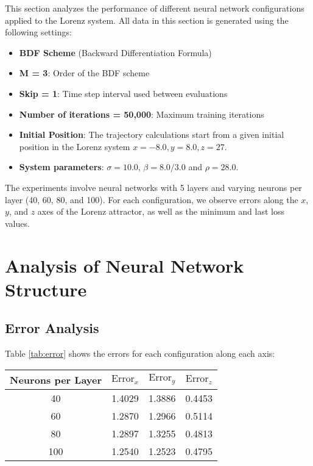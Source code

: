 This section analyzes the performance of different neural network configurations applied to the Lorenz system. All data in this section is generated using the following settings:
\begin{itemize}
    \item \textbf{BDF Scheme} (Backward Differentiation Formula)
    \item \textbf{M = 3}: Order of the BDF scheme
    \item \textbf{Skip = 1}: Time step interval used between evaluations
    \item \textbf{Number of iterations = 50,000}: Maximum training iterations
    \item \textbf{Initial Position}: The trajectory calculations start from a given initial position in the Lorenz system $x = -8.0, y = 8.0, z = 27$.
    \item \textbf{System parameters}: $\sigma = 10.0$, $\beta = 8.0/3.0$ and $\rho = 28.0$.
\end{itemize}

The experiments involve neural networks with 5 layers and varying neurons per layer (40, 60, 80, and 100). For each configuration, we observe errors along the \( x \), \( y \), and \( z \) axes of the Lorenz attractor, as well as the minimum and last loss values.

\section{Analysis of Neural Network Structure}
\subsection{Error Analysis}

Table \ref{tab:error} shows the errors for each configuration along each axis:

\begin{center}\label{tab:error}
\begin{tabular}{|c|c|c|c|}
\hline
Neurons per Layer & \( \text{Error}_x \) & \( \text{Error}_y \) & \( \text{Error}_z \) \\
\hline
40 & 1.4029 & 1.3886 & 0.4453 \\
60 & 1.2870 & 1.2966 & 0.5114 \\
80 & 1.2897 & 1.3255 & 0.4813 \\
100 & 1.2540 & 1.2523 & 0.4795 \\
\hline
\end{tabular}
\end{center}

